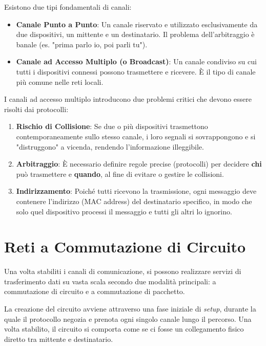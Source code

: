 Esistono due tipi fondamentali di canali:
\begin{itemize}
    \item \textbf{Canale Punto a Punto}: Un canale riservato e utilizzato esclusivamente da due dispositivi, un mittente e un destinatario. Il problema dell'arbitraggio è banale (es. "prima parlo io, poi parli tu").
    \item \textbf{Canale ad Accesso Multiplo (o Broadcast)}: Un canale condiviso su cui tutti i dispositivi connessi possono trasmettere e ricevere. È il tipo di canale più comune nelle reti locali.
\end{itemize}
I canali ad accesso multiplo introducono due problemi critici che devono essere risolti dai protocolli:
\begin{enumerate}
    \item \textbf{Rischio di Collisione}: Se due o più dispositivi trasmettono contemporaneamente sullo stesso canale, i loro segnali si sovrappongono e si "distruggono" a vicenda, rendendo l'informazione illeggibile.
    \item \textbf{Arbitraggio}: È necessario definire regole precise (protocolli) per decidere \textbf{chi} può trasmettere e \textbf{quando}, al fine di evitare o gestire le collisioni.
    \item \textbf{Indirizzamento}: Poiché tutti ricevono la trasmissione, ogni messaggio deve contenere l'indirizzo (MAC address) del destinatario specifico, in modo che solo quel dispositivo processi il messaggio e tutti gli altri lo ignorino.
\end{enumerate}



\section{Reti a Commutazione di Circuito}
Una volta stabiliti i canali di comunicazione, si possono realizzare servizi di trasferimento dati su vasta scala secondo due modalità principali: a commutazione di circuito e a commutazione di pacchetto.

La creazione del circuito avviene attraverso una fase iniziale di \textit{setup}, durante la quale il protocollo negozia e prenota ogni singolo canale lungo il percorso. Una volta stabilito, il circuito si comporta come se ci fosse un collegamento fisico diretto tra mittente e destinatario.

